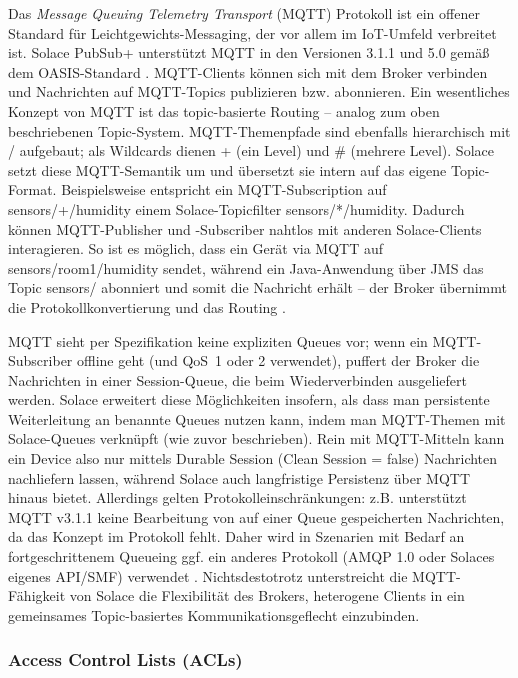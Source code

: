 Das \textit{Message Queuing Telemetry Transport} (MQTT) Protokoll ist ein offener Standard für Leichtgewichts-Messaging, der vor allem im IoT-Umfeld verbreitet ist. Solace PubSub+ unterstützt MQTT in den Versionen 3.1.1 und 5.0 gemäß dem OASIS-Standard \cite{SolaceMQTT}. MQTT-Clients können sich mit dem Broker verbinden und Nachrichten auf MQTT-Topics publizieren bzw. abonnieren. Ein wesentliches Konzept von MQTT ist das topic-basierte Routing – analog zum oben beschriebenen Topic-System. MQTT-Themenpfade sind ebenfalls hierarchisch mit / aufgebaut; als Wildcards dienen + (ein Level) und \# (mehrere Level). Solace setzt diese MQTT-Semantik um und übersetzt sie intern auf das eigene Topic-Format. Beispielsweise entspricht ein MQTT-Subscription auf sensors/+/humidity einem Solace-Topicfilter sensors/*/humidity. Dadurch können MQTT-Publisher und -Subscriber nahtlos mit anderen Solace-Clients interagieren. So ist es möglich, dass ein Gerät via MQTT auf sensors/room1/humidity sendet, während ein Java-Anwendung über JMS das Topic sensors/\> abonniert und somit die Nachricht erhält – der Broker übernimmt die Protokollkonvertierung und das Routing \cite{SolaceProtocols}.

MQTT sieht per Spezifikation keine expliziten Queues vor; wenn ein MQTT-Subscriber offline geht (und QoS 1 oder 2 verwendet), puffert der Broker die Nachrichten in einer Session-Queue, die beim Wiederverbinden ausgeliefert werden. Solace erweitert diese Möglichkeiten insofern, als dass man persistente Weiterleitung an benannte Queues nutzen kann, indem man MQTT-Themen mit Solace-Queues verknüpft (wie zuvor beschrieben). Rein mit MQTT-Mitteln kann ein Device also nur mittels Durable Session (Clean Session = false) Nachrichten nachliefern lassen, während Solace auch langfristige Persistenz über MQTT hinaus bietet. Allerdings gelten Protokolleinschränkungen: z.B. unterstützt MQTT v3.1.1 keine Bearbeitung von auf einer Queue gespeicherten Nachrichten, da das Konzept im Protokoll fehlt. Daher wird in Szenarien mit Bedarf an fortgeschrittenem Queueing ggf. ein anderes Protokoll (AMQP 1.0 oder Solaces eigenes API/SMF) verwendet \cite{SolaceDaprMQTT}. Nichtsdestotrotz unterstreicht die MQTT-Fähigkeit von Solace die Flexibilität des Brokers, heterogene Clients in ein gemeinsames Topic-basiertes Kommunikationsgeflecht einzubinden.

\subsubsection{Access Control Lists (ACLs)}

